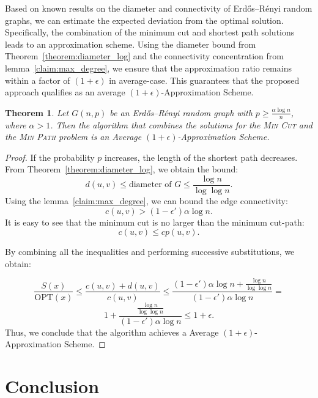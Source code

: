 \documentclass[journal ]{new-aiaa}
\numberwithin{equation}{section}
\theoremstyle{definition}
\theoremstyle{plain}
\newtheorem{theorem}[definition]{Theorem}
\theoremstyle{remark}
\begin{document}
Based on known results on the diameter and connectivity of Erdős–Rényi random graphs, we can estimate the expected deviation from the optimal solution. Specifically, the combination of the minimum cut and shortest path solutions leads to an approximation scheme. Using the diameter bound from Theorem~\ref{theorem:diameter_log} and the connectivity concentration from lemma~\ref{claim:max_degree}, we ensure that the approximation ratio remains within a factor of \( (1+\epsilon) \) in average-case. This guarantees that the proposed approach qualifies as an average \( (1+\epsilon) \)-Approximation Scheme.

\begin{theorem}
Let \( G(n, p) \) be an Erdős–Rényi random graph with \( p \geq \frac{\alpha \log n}{n} \), where \( \alpha > 1 \). Then the algorithm that combines the solutions for the \textsc{Min Cut} and the \textsc{Min Path} problem is an Average \( (1+\epsilon) \)-Approximation Scheme.
\end{theorem}
 
\begin{proof}
If the probability \( p \) increases, the length of the shortest path decreases. From Theorem~\ref{theorem:diameter_log}, we obtain the bound:
\[
d(u,v) \leq \text{diameter of } G\leq \frac{\log n}{\log \log n}.
\]
Using the lemma~\ref{claim:max_degree}, we can bound the edge connectivity:
\[
c(u,v) > (1 - \epsilon')\alpha \log n.
\]
It is easy to see that the minimum cut is no larger than the minimum cut-path:
\[
c(u,v) \leq cp(u,v).
\]

By combining all the inequalities and performing successive substitutions, we obtain:

$$
\frac{S(x)}{\text{OPT}(x)} \leq \frac{c(u,v)+d(u,v)}{c(u,v)}\leq 
\frac{(1 - \epsilon')\alpha \log n + \frac{\log n}{\log \log n}}{(1 - \epsilon')\alpha \log n}=
$$
$$
1+\frac{\frac{\log n}{\log \log n}}{(1 - \epsilon')\alpha \log n}\leq 1 +\epsilon.
$$
Thus, we conclude that the algorithm achieves a Average $(1+\epsilon)$-Approximation Scheme.
\end{proof}


\section{Conclusion}
\label{sec:conclusion}
\end{document}
